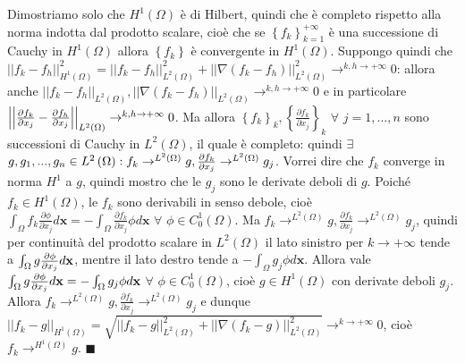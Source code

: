 \documentclass{article}
\begin{document}
Dimostriamo solo che $H^{1}\left( \Omega \right) $ \`{e} di Hilbert, quindi
che \`{e} completo rispetto alla norma indotta dal prodotto scalare, cio\`{e}
che se $\left\{ f_{k}\right\} _{k=1}^{+\infty }$ \`{e} una successione di
Cauchy in $H^{1}\left( \Omega \right) $ allora $\left\{ f_{k}\right\} $ \`{e}
convergente in $H^{1}\left( \Omega \right) $. Suppongo quindi che $%
\left\vert \left\vert f_{k}-f_{h}\right\vert \right\vert _{H^{1}\left(
\Omega \right) }^{2}=\left\vert \left\vert f_{k}-f_{h}\right\vert
\right\vert _{L^{2}\left( \Omega \right) }^{2}+\left\vert \left\vert \nabla
\left( f_{k}-f_{h}\right) \right\vert \right\vert _{L^{2}\left( \Omega
\right) }^{2}\rightarrow ^{k,h\rightarrow +\infty }0$: allora anche $%
\left\vert \left\vert f_{k}-f_{h}\right\vert \right\vert _{L^{2}\left(
\Omega \right) },\left\vert \left\vert \nabla \left( f_{k}-f_{h}\right)
\right\vert \right\vert _{L^{2}\left( \Omega \right) }\rightarrow
^{k,h\rightarrow +\infty }0$ e in particolare $\left\vert \left\vert \frac{%
\partial f_{k}}{\partial x_{j}}-\frac{\partial f_{h}}{\partial x_{j}}%
\right\vert \right\vert _{L^{2}\left( \Omega \right) }\rightarrow
^{k,h\rightarrow +\infty }0$. Ma allora $\left\{ f_{k}\right\} _{k},\left\{ 
\frac{\partial f_{k}}{\partial x_{j}}\right\} _{k}$ $\forall $ $j=1,...,n$
sono successioni di Cauchy in $L^{2}\left( \Omega \right) $, il quale \`{e}
completo: quindi $\exists $ $g,g_{1},...,g_{n}\in L^{2}\left( \Omega \right)
:f_{k}\rightarrow ^{L^{2}\left( \Omega \right) }g,\frac{\partial f_{k}}{%
\partial x_{j}}\rightarrow ^{L^{2}\left( \Omega \right) }g_{j}$. Vorrei dire
che $f_{k}$ converge in norma $H^{1}$ a $g$, quindi mostro che le $g_{j}$
sono le derivate deboli di $g$. Poich\'{e} $f_{k}\in H^{1}\left( \Omega
\right) $, le $f_{k}$ sono derivabili in senso debole, cio\`{e} $%
\int_{\Omega }f_{k}\frac{\partial \phi }{\partial x_{j}}d\mathbf{x}%
=-\int_{\Omega }\frac{\partial f_{k}}{\partial x_{j}}\phi d\mathbf{x}$ $%
\forall $ $\phi \in C_{0}^{1}\left( \Omega \right) $. Ma $f_{k}\rightarrow
^{L^{2}\left( \Omega \right) }g,\frac{\partial f_{k}}{\partial x_{j}}%
\rightarrow ^{L^{2}\left( \Omega \right) }g_{j}$, quindi per continuit\`{a}
del prodotto scalare in $L^{2}\left( \Omega \right) $ il lato sinistro per $%
k\rightarrow +\infty $ tende a $\int_{\Omega }g\frac{\partial \phi }{%
\partial x_{j}}d\mathbf{x}$, mentre il lato destro tende a $-\int_{\Omega
}g_{j}\phi d\mathbf{x}$. Allora vale $\int_{\Omega }g\frac{\partial \phi }{%
\partial x_{j}}d\mathbf{x}=-\int_{\Omega }g_{j}\phi d\mathbf{x}$ $\forall $ $%
\phi \in C_{0}^{1}\left( \Omega \right) $, cio\`{e} $g\in H^{1}\left( \Omega
\right) $ con derivate deboli $g_{j}$. Allora $f_{k}\rightarrow
^{L^{2}\left( \Omega \right) }g,\frac{\partial f_{k}}{\partial x_{j}}%
\rightarrow ^{L^{2}\left( \Omega \right) }g_{j}$ e dunque $\left\vert
\left\vert f_{k}-g\right\vert \right\vert _{H^{1}\left( \Omega \right) }=%
\sqrt{\left\vert \left\vert f_{k}-g\right\vert \right\vert _{L^{2}\left(
\Omega \right) }^{2}+\left\vert \left\vert \nabla \left( f_{k}-g\right)
\right\vert \right\vert _{L^{2}\left( \Omega \right) }^{2}}\rightarrow
^{k\rightarrow +\infty }0$, cio\`{e} $f_{k}\rightarrow ^{H^{1}\left( \Omega
\right) }g$. $\blacksquare $
\end{document}
